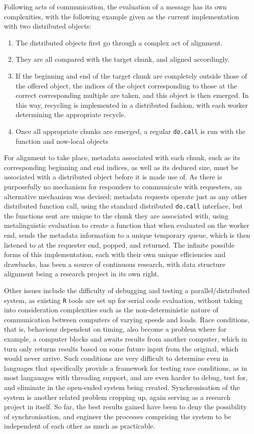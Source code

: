 Following acts of communication, the evaluation of a message has its own complexities, with the following example given as the current implementation with two distributed objects:
\begin{enumerate}
	\item The distributed objects first go through a complex act of alignment.
	\item They are all compared with the target chunk, and aligned accordingly.
	\item If the beginning and end of the target chunk are completely outside those of the offered object, the indices of the object corresponding to those at the correct corresponding multiple are taken, and this object is then emerged.
		In this way, recycling is implemented in a distributed fashion, with each worker determining the appropriate recycle.
	\item Once all appropriate chunks are emerged, a regular \texttt{do.call} is run with the function and now-local objects
\end{enumerate}
For alignment to take place, metadata associated with each chunk, such as its corresponding beginning and end indices, as well as its deduced size, must be associated with a distributed object before it is made use of.
As there is purposefully no mechanism for responders to communicate with requesters, an alternative mechanism was devised; metadata requests operate just as any other distributed function call, using the standard distributed \texttt{do.call} interface, but the functions sent are unique to the chunk they are associated with, using metalinguistic evaluation to create a function that when evaluated on the worker end, sends the metadata information to a unique temporary queue, which is then listened to at the requester end, popped, and returned.
The infinite possible forms of this implementation, each with their own unique efficiencies and drawbacks, has been a source of continuous research, with data structure alignment being a research project in its own right\cite{bryant2015computer}\cite{li1991data}.

Other issues include the difficulty of debugging and testing a parallel/distributed system, as existing \texttt{R} tools are set up for serial code evaluation, without taking into consideration complexities such as the non-deterministic nature of communication between computers of varying speeds and loads.
Race conditions, that is, behaviour dependent on timing, also become a problem where for example, a computer blocks and awaits results from another computer, which in turn only returns results based on some future input from the original, which would never arrive.
Such conditions are very difficult to determine even in languages that specifically provide a framework for testing race conditions, as in most langauages with threading support, and are even harder to debug, test for, and eliminate in the open-ended system being created\cite{serebryany2009threadsanitizer}.
Synchronisation of the system is another related problem cropping up, again serving as a research project in itself.
So far, the best results gained have been to deny the possibility of synchronisation, and engineer the processes comprising the system to be independent of each other as much as practicable.
